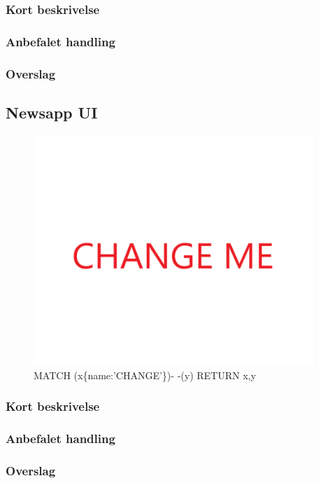 \documentclass{article}
\begin{document}
\subsubsection{Kort beskrivelse}
\subsubsection{Anbefalet handling}
\subsubsection{Overslag}
\newpage{}
\clearpage
\subsection{Newsapp UI}
\begin{figure}[h]
\includegraphics[width=300pt]{CHANGE.PNG}
\caption{MATCH (x\{name:'CHANGE'\})- -(y) RETURN x,y}
\end{figure}
\subsubsection{Kort beskrivelse}
\subsubsection{Anbefalet handling}
\subsubsection{Overslag}
\end{document}
